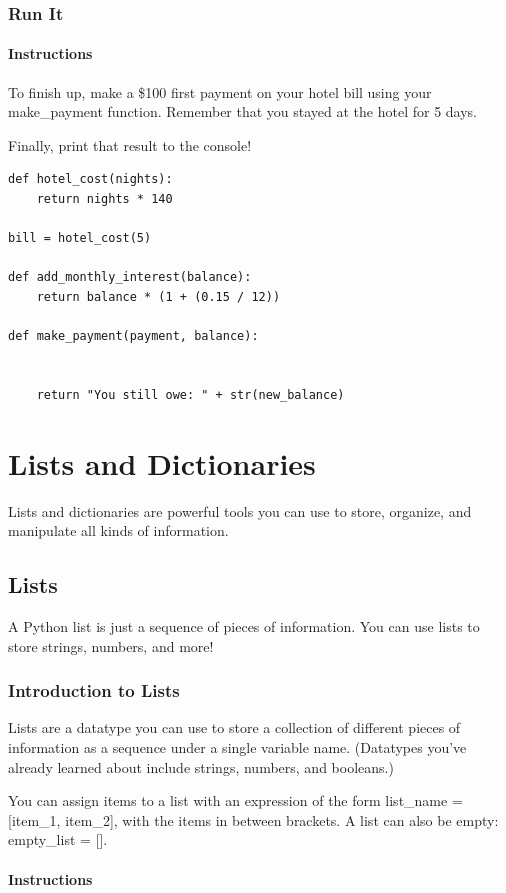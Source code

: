 \documentclass[12pt,a4paper,final,twoside,onecolumn,titlepage]{book}
\begin{document}
\subsection{Run It}
\subsubsection{Instructions}

To finish up, make a \$100 first payment on your hotel bill using your make\_payment function. Remember that you stayed at the hotel for 5 days.

Finally, print that result to the console!

\begin{lstlisting}
def hotel_cost(nights):
    return nights * 140

bill = hotel_cost(5)

def add_monthly_interest(balance):
    return balance * (1 + (0.15 / 12))

def make_payment(payment, balance):
	
	
    return "You still owe: " + str(new_balance)
\end{lstlisting}

\chapter{Lists and Dictionaries}
Lists and dictionaries are powerful tools you can use to store, organize, and manipulate all kinds of information.
\section{Lists}
    A Python list is just a sequence of pieces of information. You can use lists to store strings, numbers, and more!
\subsection{Introduction to Lists}

Lists are a datatype you can use to store a collection of different pieces of information as a sequence under a single variable name. (Datatypes you've already learned about include strings, numbers, and booleans.)

You can assign items to a list with an expression of the form list\_name = [item\_1, item\_2], with the items in between brackets. A list can also be empty: empty\_list = [].
\subsubsection{Instructions}
\end{document}
